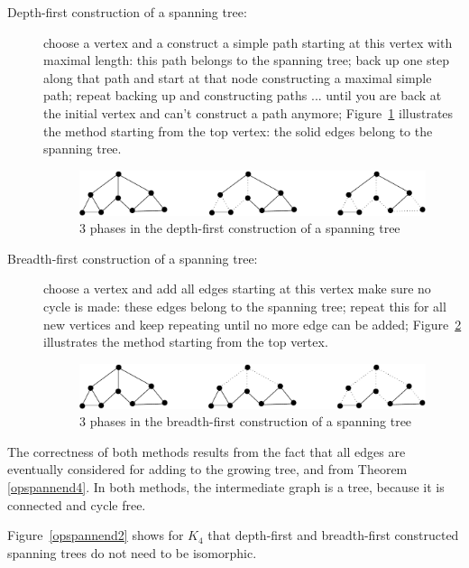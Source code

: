 \begin{description}
\item[Depth-first construction of a spanning tree:] choose a vertex
and a construct a simple path starting at this vertex with maximal
length: this path belongs to the spanning tree; back up one step along
that path and start at that node constructing a maximal simple path;
repeat backing up and constructing paths ... until you are back at the
initial vertex and can't construct a path anymore;
Figure~\ref{diepteeerst1} illustrates the method starting from the top
vertex: the solid edges belong to the spanning tree.
\begin{figure}[ht]
\begin{center}
\includegraphics[width=0.6\linewidth,keepaspectratio]{diepteeerst1}
\end{center}
\caption{3 phases in the depth-first construction of a spanning
tree \label{diepteeerst1}}
\end{figure}

\item[Breadth-first construction of a spanning tree:]
choose a vertex and add all edges starting at this vertex make sure no
cycle is made: these edges belong to the spanning tree; repeat this
for all new vertices and keep repeating until no more edge can be
added; Figure~\ref{breedteeerst1} illustrates the method starting from
the top vertex.


\begin{figure}[ht]
\begin{center}
\includegraphics[width=0.6\linewidth,keepaspectratio]{breedteeerst1}
\end{center}
\caption{3 phases in the breadth-first construction of a spanning tree \label{breedteeerst1}}
\end{figure}
\end{description}

The correctness of both methods results from the fact that all edges
are eventually considered for adding to the growing tree, and from
Theorem \ref{opspannend4}. In both methods, the intermediate graph is
a tree, because it is connected and cycle free.

Figure~\ref{opspannend2} shows for $K_{4}$ that depth-first and
breadth-first constructed spanning trees do not need to be isomorphic.

